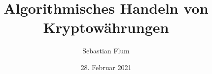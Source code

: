 \documentclass[oneside]{ausarbeitung}
\begin{document}


\Projektbericht

\Informatik

\title{Algorithmisches Handeln von Kryptowährungen}

\author{Sebastian Flum}

\examinerIsAProfessorfalse


\date{28. Februar 2021}

\maketitle
\cleardoublepage

\setcounter{page}{1}

\makeaffirmation
\cleardoublepage
\end{document}
